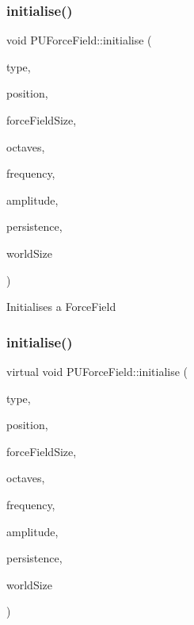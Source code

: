 \subsubsection{\texorpdfstring{initialise()}{initialise()}\hspace{0.1cm}{\footnotesize\ttfamily [1/4]}}
{\footnotesize\ttfamily void P\+U\+Force\+Field\+::initialise (\begin{DoxyParamCaption}\item[{Force\+Field\+Type}]{type,  }\item[{const \hyperlink{classVec3}{Vec3} \&}]{position,  }\item[{unsigned int}]{force\+Field\+Size,  }\item[{unsigned short}]{octaves,  }\item[{double}]{frequency,  }\item[{double}]{amplitude,  }\item[{double}]{persistence,  }\item[{const \hyperlink{classVec3}{Vec3} \&}]{world\+Size }\end{DoxyParamCaption})\hspace{0.3cm}{\ttfamily [virtual]}}

Initialises a Force\+Field \mbox{\label{classPUForceField_aca08e441cd22af729ec4f7bcf562607c}} 
\subsubsection{\texorpdfstring{initialise()}{initialise()}\hspace{0.1cm}{\footnotesize\ttfamily [2/4]}}
{\footnotesize\ttfamily virtual void P\+U\+Force\+Field\+::initialise (\begin{DoxyParamCaption}\item[{Force\+Field\+Type}]{type,  }\item[{const \hyperlink{classVec3}{Vec3} \&}]{position,  }\item[{unsigned int}]{force\+Field\+Size,  }\item[{unsigned short}]{octaves,  }\item[{double}]{frequency,  }\item[{double}]{amplitude,  }\item[{double}]{persistence,  }\item[{const \hyperlink{classVec3}{Vec3} \&}]{world\+Size }\end{DoxyParamCaption})\hspace{0.3cm}{\ttfamily [virtual]}}

